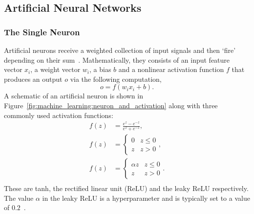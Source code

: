 \subsection{Artificial Neural Networks}

\subsubsection{The Single Neuron}
Artificial neurons receive a weighted collection of input signals and then `fire' depending on their sum~\cite{CS231n}. Mathematically, they consists of an input feature vector $x_{i}$, a weight vector $w_{i}$, a bias $b$ and a nonlinear activation function $f$ that produces an output $o$ via the following computation,
\begin{equation}
    o = f(w_{i}x_{i} + b).
\end{equation}
A schematic of an artificial neuron is shown in Figure~\ref{fig:machine_learning:neuron_and_activation} along with three commonly used activation functions:
\begin{equation}
    \begin{split}
        f(z) &= \frac{e^{z}-e^{-z}}{e^z+e^{-z}}, \\%
        f(z) &= 
        \begin{cases} 
            0 & z \leq 0\\
            z & z > 0
        \end{cases}, \\%
        f(z) &=  
        \begin{cases} 
            \alpha{z} & z \leq 0\\
            z & z > 0
        \end{cases}. \\%
    \end{split}
\end{equation}
These are tanh, the rectified linear unit (ReLU) and the leaky ReLU respectively. 
The value $\alpha$ in the leaky ReLU is a hyperparameter and is typically set to a value of $0.2$~\cite{CS231n}.
